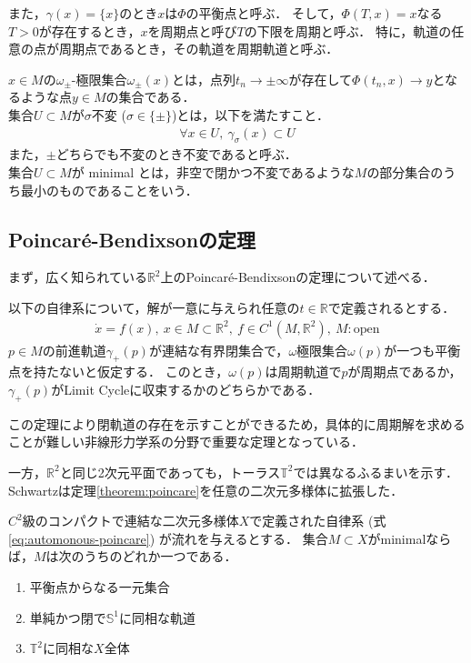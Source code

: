 \documentclass[../main]{subfiles}
\begin{document}
また，$\gamma(x)=\{x\}$のとき$x$は$\Phi$の平衡点と呼ぶ．
そして，$\Phi(T,x)=x$なる$T>0$が存在するとき，$x$を周期点と呼び$T$の下限を周期と呼ぶ．
特に，軌道の任意の点が周期点であるとき，その軌道を周期軌道と呼ぶ．

$x\in M$の$\omega_\pm$-極限集合$\omega_\pm(x)$とは，点列$t_n\to \pm\infty$が存在して$\Phi(t_n,x)\to y$となるような点$y\in M$の集合である．\\
集合$U\subset M$が$\sigma$不変 ($\sigma\in\{\pm\}$)とは，以下を満たすこと．
\begin{align*}
    \forall x\in U,\ \gamma_\sigma (x)\subset U
\end{align*}
また，$\pm$どちらでも不変のとき不変であると呼ぶ．\\
集合$U\subset M$が minimal とは，非空で閉かつ不変であるような$M$の部分集合のうち最小のものであることをいう．
\subsection{Poincaré-Bendixsonの定理}
まず，広く知られている$\mathbb{R}^2$上のPoincaré-Bendixsonの定理について述べる．
\begin{theorem}
    以下の自律系について，解が一意に与えられ任意の$t\in\mathbb{R}$で定義されるとする．
    \begin{align}
        \dot{x}=f(x),\ x\in M\subset \mathbb{R}^2,\ f\in C^1(M,\mathbb{R}^2),\ M:\mathrm{open}         \label{eq:automonous-poincare}
    \end{align}
    $p\in M$の前進軌道$\gamma_+(p)$が連結な有界閉集合で，$\omega$極限集合$\omega(p)$が一つも平衡点を持たないと仮定する．
    このとき，$\omega(p)$は周期軌道で$p$が周期点であるか，$\gamma_+(p)$がLimit Cycleに収束するかのどちらかである．
    \label{theorem:poincare}
\end{theorem}
この定理により閉軌道の存在を示すことができるため，具体的に周期解を求めることが難しい非線形力学系の分野で重要な定理となっている．

一方，$\mathbb{R}^2$と同じ2次元平面であっても，トーラス$\mathbb{T}^2$では異なるふるまいを示す．
Schwartzは定理\ref{theorem:poincare}を任意の二次元多様体に拡張した\cite{Schwartz1963ErrataAG}．
\begin{theorem}
    \label{thm:poiben-gen}
    $C^2$級のコンパクトで連結な二次元多様体$X$で定義された自律系 (式\eqref{eq:automonous-poincare}) が流れを与えるとする．
    集合$M\subset X$がminimalならば，$M$は次のうちのどれか一つである．
    \begin{enumerate}
        \item 平衡点からなる一元集合
        \item 単純かつ閉で$\mathbb{S}^1$に同相な軌道
        \item $\mathbb{T}^2$に同相な$X$全体
    \end{enumerate}
\end{theorem}
\end{document}
